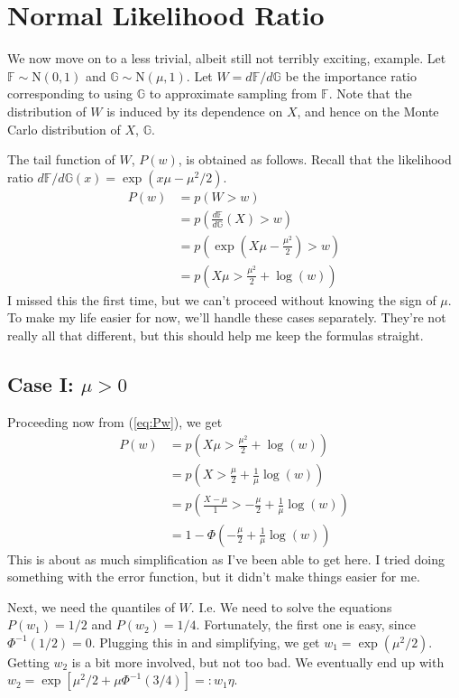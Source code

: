 \documentclass{article}
\newcommand{\bG}{\mathbb{G}}
\newcommand{\bF}{\mathbb{F}}
\newcommand{\dfdg}{d \bF / d \bG}
\begin{document}
\section{Normal Likelihood Ratio}

We now move on to a less trivial, albeit still not terribly exciting, example. Let $\bF \sim \mathrm{N}(0,1)$ and $\bG \sim \mathrm{N}(\mu, 1)$. Let $W = d \bF / d \bG$ be the importance ratio corresponding to using $\bG$ to approximate sampling from $\bF$. Note that the distribution of $W$ is induced by its dependence on $X$, and hence on the Monte Carlo distribution of $X$, $\bG$.

The tail function of $W$, $P(w)$, is obtained as follows. Recall that the likelihood ratio $\dfdg(x) = \exp(x \mu - \mu^2 / 2)$.
%
\begin{align}
    P(w) &= p(W > w)\\
    &= p \left( \frac{d \bF}{d \bG}(X) > w \right)\\
    &= p \left( \exp(X \mu - \frac{\mu^2}{2}) > w \right)\\
    &= p \left( X \mu > \frac{\mu^2}{2} + \log(w) \right) \label{eq:Pw}
\end{align}
%
I missed this the first time, but we can't proceed without knowing the sign of $\mu$. To make my life easier for now, we'll handle these cases separately. They're not really all that different, but this should help me keep the formulas straight.

\subsection{Case I: $\mu > 0$}

Proceeding now from (\ref{eq:Pw}), we get
%
\begin{align}
    P(w) &= p \left( X \mu > \frac{\mu^2}{2} + \log(w) \right)\\
    &= p \left( X > \frac{\mu}{2} + \frac{1}{\mu} \log(w) \right)\\
    &= p \left( \frac{X - \mu}{1} > - \frac{\mu}{2} + \frac{1}{\mu} \log(w) \right)\\
    &= 1 - \Phi \left( - \frac{\mu}{2} + \frac{1}{\mu} \log(w) \right)
\end{align}
%
This is about as much simplification as I've been able to get here. I tried doing something with the error function, but it didn't make things easier for me.

Next, we need the quantiles of $W$. I.e. We need to solve the equations $P(w_1) = 1/2$ and $P(w_2) = 1/4$. Fortunately, the first one is easy, since $\Phi^{-1}(1/2) = 0$. Plugging this in and simplifying, we get $w_1 = \exp(\mu^2 / 2)$. Getting $w_2$ is a bit more involved, but not too bad. We eventually end up with $w_2 = \exp[\mu^2 / 2 + \mu \Phi^{-1}(3/4)] =: w_1 \eta$. 
\end{document}
